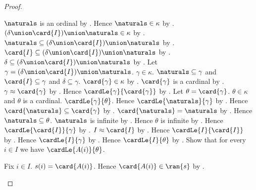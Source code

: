 \begin{proof}
\begin{byCase}
            $\naturals$ is an ordinal by .
            Hence $\naturals\in\kappa$ by
                .
            $(\delta\union\card{I})\union\naturals\in\kappa$ by
                .
            $\naturals\subseteq
                (\delta\union\card{I})\union\naturals$ by
                .
            $\card{I}\subseteq
                (\delta\union\card{I})\union\naturals$ by
                .
            $\delta\subseteq
                (\delta\union\card{I})\union\naturals$ by
                .
            Let $\gamma=(\delta\union\card{I})\union\naturals$.
            $\gamma\in\kappa$.
            $\naturals\subseteq\gamma$ and $\card{I}\subseteq\gamma$ and
                $\delta\subseteq\gamma$.
            $\card{\gamma}\in\kappa$ by
                .
            $\card{\gamma}$ is a cardinal by .
            $\gamma\approx\card{\gamma}$ by
                .
            Hence $\cardLe{\gamma}{\card{\gamma}}$ by
                .
            Let $\theta=\card{\gamma}$.
            $\theta\in\kappa$ and $\theta$ is a cardinal.
            $\cardLe{\gamma}{\theta}$.
            Hence $\cardLe{\naturals}{\gamma}$ by
                .
            Hence $\card{\naturals}\subseteq\card{\gamma}$ by
                .
            $\card{\naturals}=\naturals$ by .
            Hence $\naturals\subseteq\theta$.
            $\naturals$ is infinite by .
            Hence $\theta$ is infinite by .
            Hence $\cardLe{\card{I}}{\gamma}$ by
                .
            $I\approx\card{I}$ by .
            Hence $\cardLe{I}{\card{I}}$ by
                .
            Hence $\cardLe{I}{\gamma}$ by
                .
            Hence $\cardLe{I}{\theta}$ by
                .
            Show that for every $i\in I$ we have
                $\cardLe{A(i)}{\theta}$.
            \begin{subproof}
                Fix $i\in I$.
                $s(i)=\card{A(i)}$.
                Hence $\card{A(i)}\in\ran{s}$ by
                    .

\end{subproof}
\end{byCase}
\end{proof}
